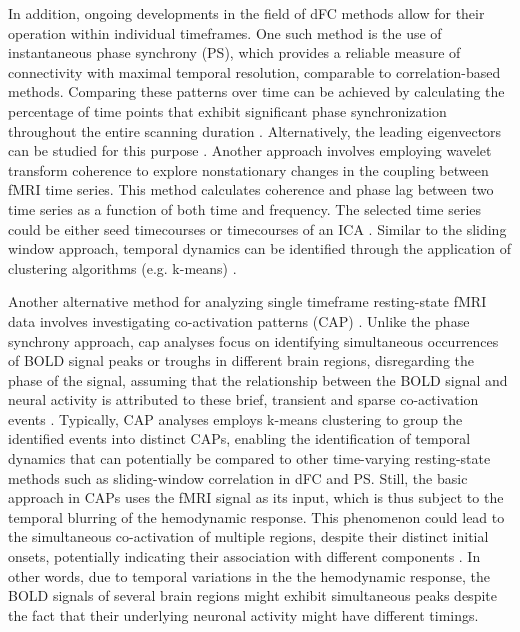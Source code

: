 In addition, ongoing developments in the field of dFC methods allow for their
operation within individual timeframes. One such method is the use of
instantaneous phase synchrony (PS), which provides a reliable measure of
connectivity with maximal temporal resolution, comparable to correlation-based
methods. Comparing these patterns over time can be achieved by calculating the
percentage of time points that exhibit significant phase synchronization
throughout the entire scanning duration
\citep{Glerean2012FunctionalMagneticResonance}. Alternatively, the leading
eigenvectors can be studied for this purpose
\citep{Cabral2017Cognitiveperformancehealthy}. Another approach involves
employing wavelet transform coherence to explore nonstationary changes in the
coupling between fMRI time series. This method calculates coherence and phase
lag between two time series as a function of both time and frequency. The
selected time series could be either seed timecourses
\citep{Chang2010Timefrequencydynamicsresting} or timecourses of an ICA
\citep{Yaesoubi2015Dynamiccoherenceanalysis}. Similar to the sliding window
approach, temporal dynamics can be identified through the application of
clustering algorithms (e.g. k-means)
\citep{Yaesoubi2015Dynamiccoherenceanalysis,Cabral2017Cognitiveperformancehealthy}.

Another alternative method for analyzing single timeframe resting-state fMRI
data involves investigating co-activation patterns (CAP)
\citep{Tagliazucchi2012Criticalitylargescale,Liu2013Decompositionspontaneousbrain,Chen2015Introducingcoactivation,Liu2018Coactivationpatterns}.
Unlike the phase synchrony approach, \acrshort*{cap} analyses focus on
identifying simultaneous occurrences of BOLD signal peaks or troughs in
different brain regions, disregarding the phase of the signal, assuming that the
relationship between the BOLD signal and neural activity is attributed to these
brief, transient and sparse co-activation events
\citep{Zhang2020relationshipBOLDneural}. Typically, CAP analyses employs k-means
clustering to group the identified events into distinct CAPs, enabling the
identification of temporal dynamics that can potentially be compared to other
time-varying resting-state methods such as sliding-window correlation in dFC and
PS. Still, the basic approach in CAPs uses the fMRI signal as its input, which
is thus subject to the temporal blurring of the hemodynamic response. This
phenomenon could lead to the simultaneous co-activation of multiple regions,
despite their distinct initial onsets, potentially indicating their association
with different components \citep{Rangaprakash2018Hemodynamicresponsefunction}.
In other words, due to temporal variations in the the hemodynamic response, the
BOLD signals of several brain regions might exhibit simultaneous peaks despite
the fact that their underlying neuronal activity might have different timings.

